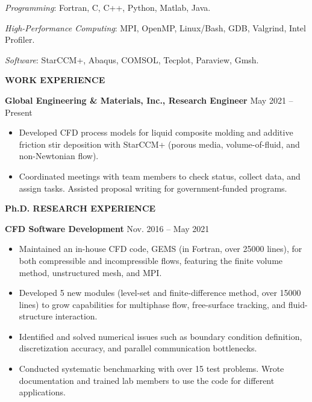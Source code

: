 \documentclass[11pt, letterpaper]{article}
\begin{document}
\fullrule

\textit{Programming}: Fortran, C, C++, Python, Matlab, Java.

\textit{High-Performance Computing}: MPI, OpenMP, Linux/Bash, GDB, Valgrind, Intel Profiler.

\textit{Software}: StarCCM+, Abaqus, COMSOL, Tecplot, Paraview, Gmsh. 



\vspace{9pt}

\textbf{WORK EXPERIENCE}

\fullrule

\textbf{Global Engineering \& Materials, Inc., Research Engineer} \hfill May 2021 -- Present
\begin{itemize}[leftmargin=*, labelsep=5mm]
   \item Developed CFD process models for liquid composite molding and additive friction stir
      deposition with StarCCM+ (porous media, volume-of-fluid, and non-Newtonian flow).
   \item Coordinated meetings with team members to check status, collect data, and assign tasks.
      Assisted proposal writing for government-funded programs.
\end{itemize}

\vspace{9pt}

\textbf{Ph.D. RESEARCH EXPERIENCE}

\fullrule

\textbf{CFD Software Development} \hfill Nov. 2016 -- May 2021
\begin{itemize}[leftmargin=*, labelsep=5mm]
   \item Maintained an in-house CFD code, GEMS (in Fortran, over 25000 lines), for both compressible
      and incompressible flows, featuring the finite volume method, unstructured mesh, and MPI.
   \item Developed 5 new modules (level-set and finite-difference method, over 15000 lines) to grow
      capabilities for multiphase flow, free-surface tracking, and fluid-structure interaction.
   \item Identified and solved numerical issues such as boundary condition definition,
      discretization accuracy, and parallel communication bottlenecks.
   \item Conducted systematic benchmarking with over 15 test problems. Wrote documentation and
      trained lab members to use the code for different applications.
\end{itemize}
\end{document}
